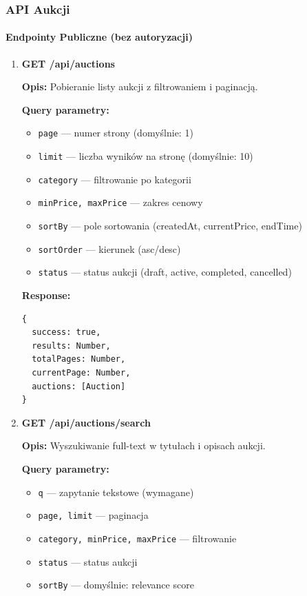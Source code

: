 \subsubsection{API Aukcji}

\paragraph{Endpointy Publiczne (bez autoryzacji)}

\begin{enumerate}
  \item \textbf{GET /api/auctions}

        \textbf{Opis:} Pobieranie listy aukcji z filtrowaniem i paginacją.

        \textbf{Query parametry:}
        \begin{itemize}
          \item \texttt{page} --- numer strony (domyślnie: 1)
          \item \texttt{limit} --- liczba wyników na stronę (domyślnie: 10)
          \item \texttt{category} --- filtrowanie po kategorii
          \item \texttt{minPrice, maxPrice} --- zakres cenowy
          \item \texttt{sortBy} --- pole sortowania (createdAt, currentPrice, endTime)
          \item \texttt{sortOrder} --- kierunek (asc/desc)
          \item \texttt{status} --- status aukcji (draft, active, completed, cancelled)
        \end{itemize}

        \textbf{Response:}
        \begin{lstlisting}
{
  success: true,
  results: Number,
  totalPages: Number,
  currentPage: Number,
  auctions: [Auction]
}
\end{lstlisting}

  \item \textbf{GET /api/auctions/search}

        \textbf{Opis:} Wyszukiwanie full-text w tytułach i opisach aukcji.

        \textbf{Query parametry:}
        \begin{itemize}
          \item \texttt{q} --- zapytanie tekstowe (wymagane)
          \item \texttt{page, limit} --- paginacja
          \item \texttt{category, minPrice, maxPrice} --- filtrowanie
          \item \texttt{status} --- status aukcji
          \item \texttt{sortBy} --- domyślnie: relevance score
        \end{itemize}


\end{enumerate}
